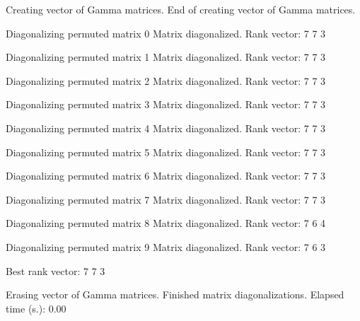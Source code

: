 \documentclass[]{article}
\newenvironment{Shaded}{}{}
\newcommand{\BuiltInTok}[1]{#1}
\newcommand{\ExtensionTok}[1]{#1}
\newcommand{\NormalTok}[1]{#1}
\begin{document}
\begin{Shaded}
\begin{Highlighting}[]
\ExtensionTok{Creating}\NormalTok{ vector of Gamma matrices.}
\ExtensionTok{End}\NormalTok{ of creating vector of Gamma matrices.}

\ExtensionTok{Diagonalizing}\NormalTok{ permuted matrix 0}
\ExtensionTok{Matrix}\NormalTok{ diagonalized.}
\ExtensionTok{Rank}\NormalTok{ vector: 7 7 3 }

\ExtensionTok{Diagonalizing}\NormalTok{ permuted matrix 1}
\ExtensionTok{Matrix}\NormalTok{ diagonalized.}
\ExtensionTok{Rank}\NormalTok{ vector: 7 7 3 }

\ExtensionTok{Diagonalizing}\NormalTok{ permuted matrix 2}
\ExtensionTok{Matrix}\NormalTok{ diagonalized.}
\ExtensionTok{Rank}\NormalTok{ vector: 7 7 3 }

\ExtensionTok{Diagonalizing}\NormalTok{ permuted matrix 3}
\ExtensionTok{Matrix}\NormalTok{ diagonalized.}
\ExtensionTok{Rank}\NormalTok{ vector: 7 7 3 }

\ExtensionTok{Diagonalizing}\NormalTok{ permuted matrix 4}
\ExtensionTok{Matrix}\NormalTok{ diagonalized.}
\ExtensionTok{Rank}\NormalTok{ vector: 7 7 3 }

\ExtensionTok{Diagonalizing}\NormalTok{ permuted matrix 5}
\ExtensionTok{Matrix}\NormalTok{ diagonalized.}
\ExtensionTok{Rank}\NormalTok{ vector: 7 7 3 }

\ExtensionTok{Diagonalizing}\NormalTok{ permuted matrix 6}
\ExtensionTok{Matrix}\NormalTok{ diagonalized.}
\ExtensionTok{Rank}\NormalTok{ vector: 7 7 3 }

\ExtensionTok{Diagonalizing}\NormalTok{ permuted matrix 7}
\ExtensionTok{Matrix}\NormalTok{ diagonalized.}
\ExtensionTok{Rank}\NormalTok{ vector: 7 7 3 }

\ExtensionTok{Diagonalizing}\NormalTok{ permuted matrix 8}
\ExtensionTok{Matrix}\NormalTok{ diagonalized.}
\ExtensionTok{Rank}\NormalTok{ vector: 7 6 4 }

\ExtensionTok{Diagonalizing}\NormalTok{ permuted matrix 9}
\ExtensionTok{Matrix}\NormalTok{ diagonalized.}
\ExtensionTok{Rank}\NormalTok{ vector: 7 6 3 }

\ExtensionTok{Best}\NormalTok{ rank vector: 7 7 3 }

\ExtensionTok{Erasing}\NormalTok{ vector of Gamma matrices.}
\ExtensionTok{Finished}\NormalTok{ matrix diagonalizations. Elapsed time (s.)}\BuiltInTok{:}\NormalTok{ 0.00}
\end{Highlighting}
\end{Shaded}
\end{document}
